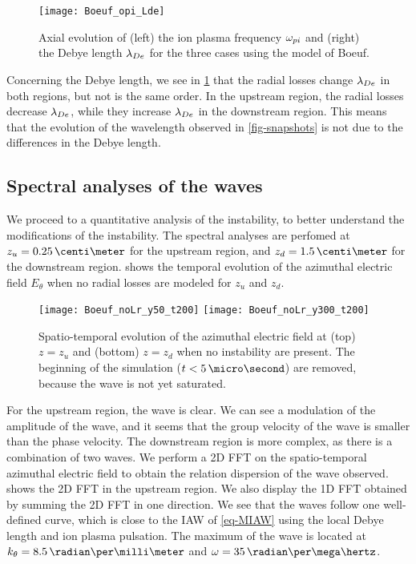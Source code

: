 \begin{figure}[hbt]
  \centering
  \texttt{[image: Boeuf\_opi\_Lde]}
  \caption{Axial evolution of (left) the ion plasma frequency $\omega_{pi}$ and (right) the Debye length $\lambda_{De}$ for the three cases using the model of Boeuf.}
  \label{fig-wpi_Lde}
\end{figure}


Concerning the Debye length, we see in \cref{fig-wpi_Lde} that the radial losses change $\lambda_{De}$ in both regions, but not is the same order.
In the upstream region, the radial losses decrease $\lambda_{De}$, while they increase $\lambda_{De}$ in the downstream region.
This means that the evolution of the wavelength observed in \cref{fig-snapshots} is not due to the differences in the Debye length.

\subsection{Spectral analyses of the waves} \label{subsec-fft}

We proceed to a quantitative analysis of the instability, to better understand the modifications of the instability.
The spectral analyses are perfomed at $z_u=0.25\,\centi\meter$ for the upstream region, and $z_d=1.5\,\centi\meter$ for the downstream region.
 shows the temporal evolution of the azimuthal electric field $E_{\theta}$ when no radial losses are modeled for $z_u$ and $z_d$.

\begin{figure}[hbt]
  \centering
  \texttt{[image: Boeuf\_noLr\_y50\_t200]}
  \texttt{[image: Boeuf\_noLr\_y300\_t200]}
  \caption{Spatio-temporal evolution of the azimuthal electric field at (top) $z=z_u$ and (bottom) $z=z_d$ when no instability are present. The beginning of the simulation ($t<5\,\micro\second$) are removed, because the wave is not yet saturated. }
  \label{fig-cut2D}
\end{figure}


For the upstream region, the wave is clear. 
We can see a modulation of the amplitude of the wave, and it seems that the group velocity of the wave is smaller than the phase velocity.
The downstream region is more complex, as there is a combination of two waves.
We perform a \ac{2D} \ac{FFT} on the spatio-temporal azimuthal electric field to obtain the relation dispersion of the wave observed.
 shows the \ac{2D} \ac{FFT} in the upstream region.
We also display the \ac{1D} \ac{FFT} obtained by summing the \ac{2D} \ac{FFT} in one direction.
We see that the waves follow one well-defined curve, which is close to the \ac{IAW} of \cref{eq-MIAW} using the local Debye length and ion plasma pulsation.
The maximum of the wave is located at $k_{\theta} = 8.5\,\radian\per\milli\meter$ and $\omega = 35\, \radian\per\mega\hertz$.

